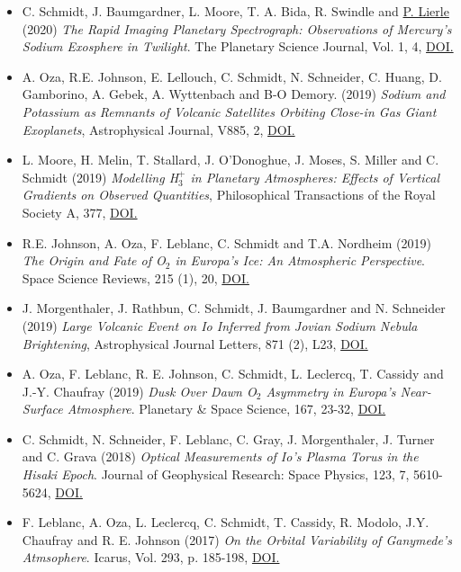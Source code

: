\documentclass[12pt]{report}
\begin{document}
\begin{itemize}
  \item C. Schmidt, J. Baumgardner, L. Moore, T. A. Bida, R. Swindle and \underline{P. Lierle} (2020) \textit{The Rapid Imaging Planetary Spectrograph: Observations of Mercury's Sodium Exosphere in Twilight}. The Planetary Science Journal, Vol. 1, 4, \href{https://doi.org/10.3847/PSJ/ab76c9}{DOI.}
  \item A. Oza, R.E. Johnson, E. Lellouch, C. Schmidt, N. Schneider, C. Huang, D. Gamborino, A. Gebek, A. Wyttenbach and B-O Demory. (2019) \textit{Sodium and Potassium as Remnants of Volcanic Satellites Orbiting Close-in Gas Giant Exoplanets}, Astrophysical Journal, V885, 2, \href{https://doi.org/10.3847/1538-4357/ab40cc}{DOI.}
  \item L. Moore, H. Melin, T. Stallard, J. O'Donoghue, J. Moses, S. Miller and C. Schmidt (2019) \textit{Modelling H$_3^+$ in Planetary Atmospheres: Effects of Vertical Gradients on Observed Quantities}, Philosophical Transactions of the Royal Society A, 377, \href{https://doi.org/10.1098/rsta.2019.0067}{DOI.}
  \item R.E. Johnson, A. Oza, F. Leblanc,  C. Schmidt and T.A. Nordheim (2019) \textit{The Origin and Fate of O$_2$ in Europa's Ice: An Atmospheric Perspective}. Space Science Reviews, 215 (1), 20, \href{https://doi.org/10.1007/s11214-019-0582-1}{DOI.}
  \item J. Morgenthaler, J. Rathbun, C. Schmidt, J. Baumgardner and N. Schneider (2019) \textit{Large Volcanic Event on Io Inferred from Jovian Sodium Nebula Brightening}, Astrophysical Journal Letters, 871 (2), L23, \href{https://doi.org/10.3847/2041-8213/aafdb7}{DOI.}
  \item A. Oza, F. Leblanc, R. E. Johnson, C. Schmidt, L. Leclercq, T. Cassidy and J.-Y. Chaufray (2019) \textit{Dusk Over Dawn O$_2$ Asymmetry in Europa's Near-Surface Atmosphere}. Planetary \& Space Science, 167, 23-32, \href{https://doi.org/10.1016/j.pss.2019.01.006}{DOI.}
  \item C. Schmidt, N. Schneider, F. Leblanc, C. Gray, J. Morgenthaler, J. Turner and C. Grava (2018) \textit{Optical Measurements of Io's Plasma Torus in the Hisaki Epoch}. Journal of Geophysical Research: Space Physics, 123, 7, 5610-5624, \href{https://doi.org/10.1029/2018JA025296}{DOI.}
  \item F. Leblanc, A. Oza, L. Leclercq, C. Schmidt, T. Cassidy, R. Modolo, J.Y. Chaufray and R. E. Johnson (2017) \textit{On the Orbital Variability of Ganymede's Atmsophere}. Icarus, Vol. 293, p. 185-198, \href{doi.org/10.1016/j.icarus.2017.04.025}{DOI.}

\end{itemize}
\end{document}
